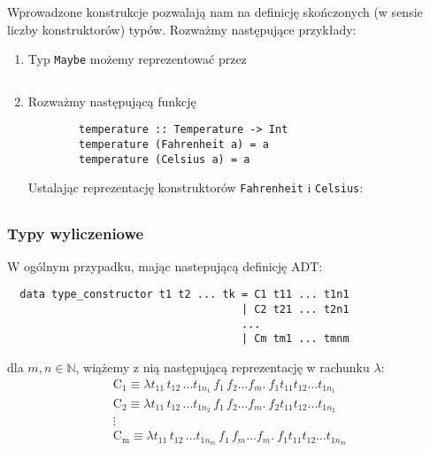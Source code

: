 \begin{przyklad}
  Wprowadzone konstrukcje pozwalają nam na definicję skończonych (w sensie liczby konstruktorów) typów. Rozważmy następujące przykłady:
  \begin{enumerate}[label=\alph*)]
    \setlength\itemsep{0em}
    \item Typ \texttt{Maybe} możemy reprezentować przez
      \begin{verbatim}
      \end{verbatim}
    \item Rozważmy następującą funkcję
      \begin{verbatim} 
        temperature :: Temperature -> Int
        temperature (Fahrenheit a) = a
        temperature (Celsius a) = a 
      \end{verbatim}
      Ustalając reprezentację konstruktorów \texttt{Fahrenheit} i \texttt{Celsius}:
      \begin{align*}

      \end{align*}
      
  \end{enumerate}

\end{przyklad}
\subsubsection{Typy wyliczeniowe}
W ogólnym przypadku, mając nastepującą definicję ADT:
\begin{verbatim}
  data type_constructor t1 t2 ... tk = C1 t11 ... t1n1
                                     | C2 t21 ... t2n1
                                     ...
                                     | Cm tm1 ... tmnm
\end{verbatim}
dla \(m, n \in \mathbb{N}\), wiążemy z nią następującą reprezentację w rachunku \(\lambda\):
\begin{gather*}
  \mathrm{C_1} \equiv \lambda t_{11}\, t_{12}\, \dots t_{1n_1}\, f_1\, f_2 \dots f_m.\ f_1 t_{11} t_{12} \dots t_{1n_1}\\
  \mathrm{C_2} \equiv \lambda t_{11}\, t_{12}\, \dots t_{1n_2}\, f_1\, f_2 \dots f_m.\ f_2 t_{11} t_{12} \dots t_{1n_2}\\
 \vdots\\
  \mathrm{C_m} \equiv \lambda t_{11}\, t_{12}\, \dots t_{1n_m}\, f_1\, f_m \dots f_m.\ f_1 t_{11} t_{12} \dots t_{1n_m}\\
\end{gather*}
